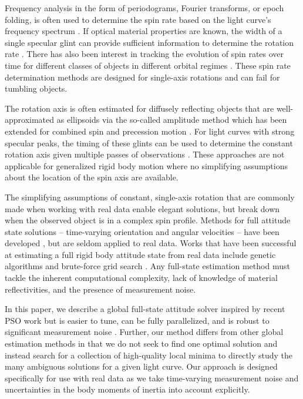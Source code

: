 \documentclass[a4paper,twocolumn]{spaceDebrisC} %
\begin{document}
Frequency analysis in the form of periodograms, Fourier transforms, or epoch folding, is often used to determine the spin rate based on the light curve's frequency spectrum \cite{silha2015, silha2021, isoletta2024, schildknecht2015, pittet2017, yanagisawa2012, koshkin2018}. If optical material properties are known, the width of a single specular glint can provide sufficient information to determine the rotation rate \cite{hinks2016}. There has also been interest in tracking the evolution of spin rates over time for different classes of objects in different orbital regimes \cite{koshkin2018, blacketer2022, karpov2016}. These spin rate determination methods are designed for single-axis rotations and can fail for tumbling objects.

The rotation axis is often estimated for diffusely reflecting objects that are well-approximated as ellipsoids via the so-called amplitude method \cite{williams1979location} which has been extended for combined spin and precession motion \cite{yanagisawa2012}. For light curves with strong specular peaks, the timing of these glints can be used to determine the constant rotation axis given multiple passes of observations \cite{vananti2023, koshkin2018}. These approaches are not applicable for generalized rigid body motion where no simplifying assumptions about the location of the spin axis are available.

The simplifying assumptions of constant, single-axis rotation that are commonly made when working with real data enable elegant solutions, but break down when the observed object is in a complex spin profile. Methods for full attitude state solutions -- time-varying orientation and angular velocities -- have been developed \cite{clark2022, burton2024journal, gagnon2024, linares2014particle}, but are seldom applied to real data. Works that have been successful at estimating a full rigid body attitude state from real data include genetic algorithms \cite{piergentili2020, gallucci2020} and brute-force grid search \cite{shafer2017}. Any full-state estimation method must tackle the inherent computational complexity, lack of knowledge of material reflectivities, and the presence of measurement noise.

In this paper, we describe a global full-state attitude solver inspired by recent PSO work \cite{burton2024journal} but is easier to tune, can be fully parallelized, and is robust to significant measurement noise \cite{robinson2025att}. Further, our method differs from other global estimation methods in that we do not seek to find one optimal solution and instead search for a collection of high-quality local minima to directly study the many ambiguous solutions for a given light curve. Our approach is designed specifically for use with real data as we take time-varying measurement noise and uncertainties in the body moments of inertia into account explicitly. 
\end{document}
